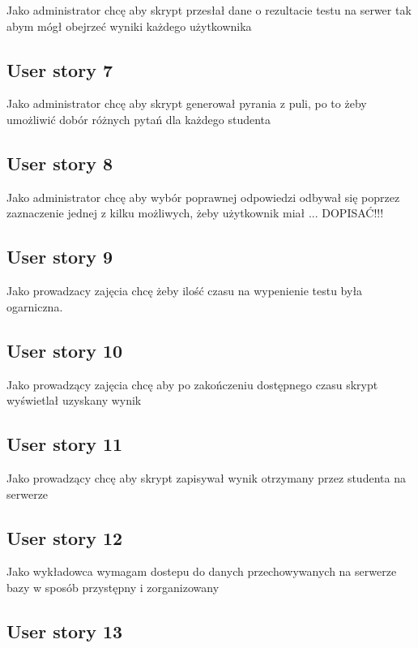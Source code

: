 \documentclass[a4paper]{article}
\begin{document}
Jako administrator chcę aby skrypt przesłał dane o rezultacie testu na serwer tak abym mógł obejrzeć wyniki każdego użytkownika

\subsection{User story 7}

Jako administrator chcę aby skrypt generował pyrania z puli, po to żeby umożliwić dobór różnych pytań dla każdego studenta

\subsection{User story 8}

Jako administrator chcę aby wybór poprawnej odpowiedzi odbywał się poprzez zaznaczenie jednej z kilku możliwych, żeby użytkownik miał ... DOPISAĆ!!!

\subsection{User story 9}

Jako prowadzacy zajęcia chcę żeby ilość czasu na wypenienie testu była ogarniczna.

\subsection{User story 10}

Jako prowadzący zajęcia chcę aby po zakończeniu dostępnego czasu skrypt wyświetlał uzyskany wynik

\subsection{User story 11}

Jako prowadzący chcę aby skrypt zapisywał wynik otrzymany przez studenta na serwerze

\subsection{User story 12}

Jako wykładowca wymagam dostepu do danych przechowywanych na serwerze bazy w sposób przystępny i zorganizowany

\subsection{User story 13}
\end{document}

